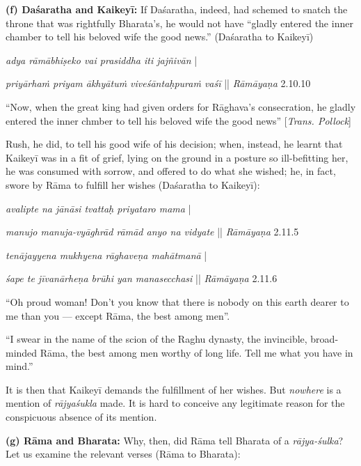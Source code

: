 \smallskip
\noindent
\textbf{(f) Daśaratha and Kaikeyī:} If Daśaratha, indeed, had schemed to snatch the throne that was rightfully Bharata’s, he would not have “gladly entered the inner chamber to tell his beloved wife the good news.” (Daśaratha to Kaikeyī) 

\begin{myquote}
{{\sl adya rāmābhiṣeko vai prasiddha iti jajñivān}} |

{\sl priyārhaṁ priyam ākhyātuṁ viveśāntaḥpuraṁ vaśī} || {\sl Rāmāyaṇa} 2.10.10
\end{myquote}

\begin{myquote}
“Now, when the great king had given orders for Rāghava’s consecration, he gladly entered the inner chmber to tell his beloved wife the good news” [{\sl Trans. Pollock}]
\end{myquote}

Rush, he did, to tell his good wife of his decision; when, instead, he learnt that Kaikeyī was in a fit of grief, lying on the ground in a posture so ill-befitting her, he was consumed with sorrow, and offered to do what she wished; he, in fact, swore by Rāma to fulfill her wishes (Daśaratha to Kaikeyī): 

\begin{myquote}
{{\sl avalipte na jānāsi tvattaḥ priyataro mama}} |

{\sl manujo manuja-vyāghrād rāmād anyo na vidyate} || {\sl Rāmāyaṇa} 2.11.5 

{\sl tenājayyena mukhyena rāghaveṇa mahātmanā} |

{\sl śape te jīvanārheṇa brūhi yan manasecchasi} || {\sl Rāmāyaṇa} 2.11.6
\end{myquote}

\begin{myquote}
“Oh proud woman! Don't you know that there is nobody on this earth dearer to me than you --- except Rāma, the best among men”.

“I swear in the name of the scion of the Raghu dynasty, the invincible, broad-minded Rāma, the best among men worthy of long life. Tell me what you have in mind.”
\end{myquote}

It is then that Kaikeyī demands the fulfillment of her wishes. But {\sl nowhere} is a mention of {\sl rājyaśukla} made. It is hard to conceive any legitimate reason for the conspicuous absence of its mention.

\smallskip
\noindent
\textbf{(g) Rāma and Bharata:}  Why, then, did Rāma tell Bharata of a {\sl rājya-śulka}? Let us examine the relevant verses (Rāma to Bharata): 

